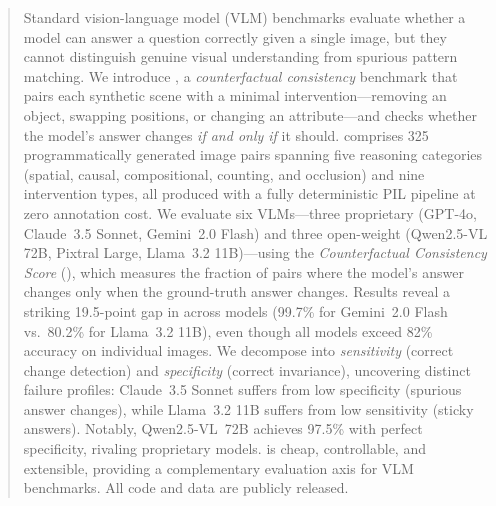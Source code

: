 \begin{abstract}

Standard vision-language model (VLM) benchmarks evaluate whether a model can answer a question correctly given a single image, but they cannot distinguish genuine visual understanding from spurious pattern matching. We introduce \method, a \emph{counterfactual consistency} benchmark that pairs each synthetic scene with a minimal intervention---removing an object, swapping positions, or changing an attribute---and checks whether the model's answer changes \emph{if and only if} it should. \method comprises 325 programmatically generated image pairs spanning five reasoning categories (spatial, causal, compositional, counting, and occlusion) and nine intervention types, all produced with a fully deterministic PIL pipeline at zero annotation cost. We evaluate six VLMs---three proprietary (GPT-4o, Claude~3.5 Sonnet, Gemini~2.0 Flash) and three open-weight (Qwen2.5-VL 72B, Pixtral Large, Llama~3.2 11B)---using the \emph{Counterfactual Consistency Score} (\ccs), which measures the fraction of pairs where the model's answer changes only when the ground-truth answer changes. Results reveal a striking 19.5-point gap in \ccs across models (99.7\% for Gemini~2.0 Flash vs.\ 80.2\% for Llama~3.2 11B), even though all models exceed 82\% accuracy on individual images. We decompose \ccs into \emph{sensitivity} (correct change detection) and \emph{specificity} (correct invariance), uncovering distinct failure profiles: Claude~3.5 Sonnet suffers from low specificity (spurious answer changes), while Llama~3.2 11B suffers from low sensitivity (sticky answers). Notably, Qwen2.5-VL~72B achieves 97.5\% \ccs with perfect specificity, rivaling proprietary models. \method is cheap, controllable, and extensible, providing a complementary evaluation axis for VLM benchmarks. All code and data are publicly released.

\end{abstract}
